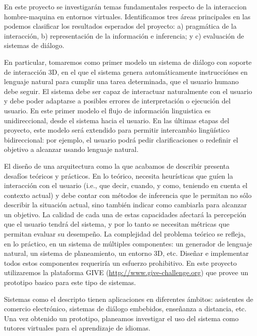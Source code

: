 En este proyecto se investigar\'an temas fundamentales respecto de la
interaccion hombre-maquina en entornos virtuales. Identificamos tres
\'areas principales en las podemos clasificar los resultados esperados
del proyecto: a) pragm\'atica de la interacci\'on, b) representaci\'on
de la informaci\'on e inferencia; y c) evaluaci\'on de sistemas
de di\'alogo.

En particular, tomaremos como primer modelo un sistema de di\'alogo con
soporte de interacci\'on 3D, en el que el sistema genera autom\'aticamente
instrucci\'ones en lenguaje natural para cumplir una tarea determinada, que
el usuario humano debe seguir.   El sistema debe ser capaz de interactuar naturalmente
con el usuario y debe poder adaptarse a posibles errores de interpretaci\'on o
ejecuci\'on del usuario.  En este primer modelo el flujo de informaci\'on
linguistica es unidireccional, desde el sistema hacia el usuario.
En las \'ultimas etapas del proyecto, este modelo ser\'a extendido para
permitir intercambio ling\"u\'istico bidireccional: por ejemplo, el usuario podr\'a
pedir clarificaciones o redefinir el objetivo a alcanzar usando lenguaje natural.

El dise\~no de una arquitectura como la que acabamos de describir presenta
desaf\'ios te\'oricos y pr\'acticos.  En lo te\'orico, necesita
heur\'isticas que gu\'ien la interacci\'on con el usuario (i.e., que decir,
cuando, y como, teniendo en cuenta el contexto actual) y debe contar con m\'etodos
de inferencia que le permitan no s\'olo describir la situaci\'on actual, sino
tambi\'en indicar como cambiarla para alcanzar un objetivo.
La calidad de cada una de estas capacidades afectar\'a la percepci\'on que
el usuario tendr\'a del sistema, y por lo tanto se necesitan m\'etricas que
permitan evaluar su desempe\~no.  La complejidad del problema te\'orico se
refleja, en lo pr\'actico, en un sistema de m\'ultiples componentes: un
generador de lenguaje natural, un sistema de planeamiento, un entorno 3D, etc.
Dise\~nar e implementar todos estos componentes requerir\'ia un esfuerzo prohibitivo.
En este proyecto utilizaremos la plataforma GIVE (\url{http://www.give-challenge.org}) que
provee un prototipo basico para este tipo de sistemas.

Sistemas como el descripto tienen aplicaciones en diferentes \'ambitos:
asistentes de comercio electr\'onico, sistemas de di\'alogo embebidos,
ense\~nanza a distancia, etc.  Una vez obtenido
un prototipo, planeamos investigar el uso del sistema como
tutores virtuales para el aprendizaje de idiomas.
